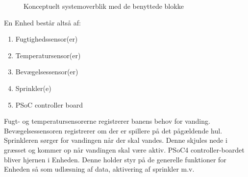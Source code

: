\begin{figure}[ht] \centering
{}
\caption{Konceptuelt systemoverblik med de benyttede blokke}
\label{fig:bloksystemoverblik}
\end{figure}

En Enhed består altså af:
\begin{enumerate}
\item Fugtighedssensor(er)
\item Temperatursensor(er)
\item Bevægelsessensor(er) 
\item Sprinkler(e)
\item PSoC controller board
\end{enumerate}

Fugt- og temperatursensorerne registrerer banens behov for vanding. Bevægelsessensoren registrerer om der er spillere på det pågældende hul. Sprinkleren sørger for vandingen når der skal vandes. Denne skjules nede i græsset og kommer op når vandingen skal være aktiv.
PSoC4 controller-boardet bliver hjernen i Enheden. Denne holder styr på de generelle funktioner for Enheden så som udlæsning af data, aktivering af sprinkler m.v.